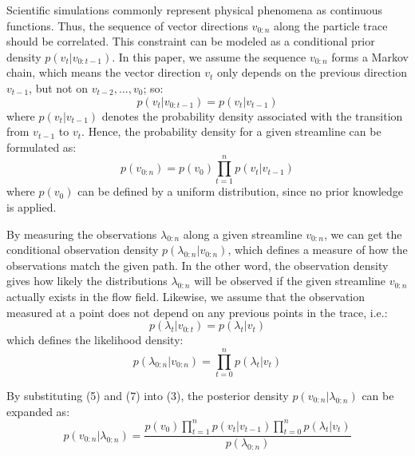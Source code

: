 Scientific simulations commonly represent physical phenomena as continuous functions. Thus, the sequence of vector directions $v_{0:n}$ along the particle trace should be correlated. This constraint can be modeled as a conditional prior density $p({v_t}|{v_{0:t - 1}})$. In this paper, we assume the sequence $v_{0:n}$ forms a Markov chain, which means the vector direction $v_t$ only depends on the previous direction $v_{t-1}$, but not on $v_{t-2},...,v_0$; so:
\begin{equation}
  p({v_t}|{v_{0:t - 1}}) = p({v_t}|{v_{t - 1}})
\end{equation}
where $p({v_t}|{v_{t - 1}})$ denotes the probability density associated with the transition from $v_{t - 1}$ to $v_t$. Hence, the probability density for a given streamline can be formulated as:
\begin{equation}
  p({v_{0:n}}) = p({v_0})\prod\limits_{t = 1}^n {p({v_t}|{v_{t - 1}})}
\end{equation}
where $p(v_0)$ can be defined by a uniform distribution, since no prior knowledge is applied.

By measuring the observations $\lambda_{0:n}$ along a given streamline $v_{0:n}$, we can get the conditional observation density $p({\lambda_{0:n}}|v_{0:n})$, which defines a measure of how the observations match the given path. In the other word, the observation density gives how likely the distributions $\lambda_{0:n}$ will be observed if the given streamline $v_{0:n}$ actually exists in the flow field. Likewise, we assume that the observation measured at a point does not depend on any previous points in the trace, i.e.:
\begin{equation}
  p(\lambda_t|v_{0:t}) = p({\lambda_t}|{v_t})
\end{equation}
which defines the likelihood density:
\begin{equation}
  p({\lambda_{0:n}}|{v_{0:n}}) = \prod\limits_{t = 0}^n {p({\lambda_t}|{v_t})}
\end{equation}

By substituting (5) and (7) into (3), the posterior density $p({v_{0:n}}|{\lambda_{0:n}})$ can be expanded as:
\begin{equation}
  p({v_{0:n}}|{\lambda_{0:n}}) = \frac{{p({v_0})\prod\limits_{t = 1}^n {p({v_t}|{v_{t - 1}})} \prod\limits_{t = 0}^n {p({\lambda_t}|{v_t})} }}{{p({\lambda_{0:n}})}}
\end{equation}

